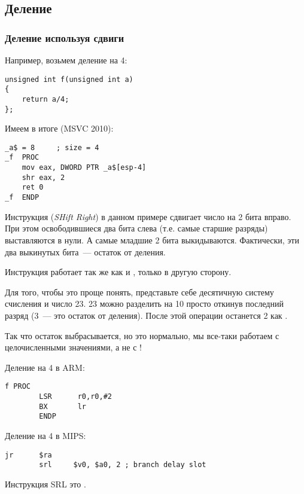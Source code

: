 \subsection{Деление}

\subsubsection{Деление используя сдвиги}
\label{division_by_shifting}

Например, возьмем деление на 4:

\begin{lstlisting}[style=customc]
unsigned int f(unsigned int a)
{
	return a/4;
};
\end{lstlisting}

Имеем в итоге (MSVC 2010):

\begin{lstlisting}[caption=MSVC 2010,style=customasmx86]
_a$ = 8		; size = 4
_f	PROC
	mov	eax, DWORD PTR _a$[esp-4]
	shr	eax, 2
	ret	0
_f	ENDP
\end{lstlisting}

\label{SHR}
Инструкция \SHR (\emph{SHift Right}) в данном примере сдвигает число на 2 бита вправо. 
При этом освободившиеся два бита слева (т.е. самые 
старшие разряды) выставляются в нули. А самые младшие 2 бита выкидываются. 
Фактически, эти два выкинутых бита~--- остаток от деления.

Инструкция \SHR работает так же как и \SHL, только в другую сторону.



Для того, чтобы это проще понять, представьте себе десятичную систему счисления и число 23. 
23 можно разделить на 10 просто откинув последний разряд (3~--- это остаток от деления). 
После этой операции останется 2 как .

Так что остаток выбрасывается, но это нормально, мы все-таки работаем с целочисленными
значениями, а не с !

Деление на 4 в ARM:

\begin{lstlisting}[caption=\NonOptimizingKeilVI (\ARMMode),style=customasmARM]
f PROC
        LSR      r0,r0,#2
        BX       lr
        ENDP
\end{lstlisting}

Деление на 4 в MIPS:

\begin{lstlisting}[caption=\Optimizing GCC 4.4.5 (IDA),style=customasmMIPS]
        jr      $ra
        srl     $v0, $a0, 2 ; branch delay slot
\end{lstlisting}

Инструкция SRL это .
